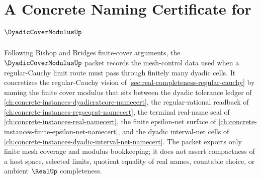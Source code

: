 \chapter{A Concrete Naming Certificate for $\DyadicCoverModulusUp$}
\label{ch:concrete-instances-dyadic-cover-modulus-namecert}

Following Bishop and Bridges finite-cover arguments, the $\DyadicCoverModulusUp$ packet records the mesh-control data used when a regular-Cauchy limit route must pass through finitely many dyadic cells. It concretizes the regular-Cauchy vision of \autoref{sec:real-completeness-regular-cauchy} by naming the finite cover modulus that sits between the dyadic tolerance ledger of \autoref{ch:concrete-instances-dyadicratcore-namecert}, the regular-rational readback of \autoref{ch:concrete-instances-regseqrat-namecert}, the terminal real-name seal of \autoref{ch:concrete-instances-real-namecert}, the finite epsilon-net surface of \autoref{ch:concrete-instances-finite-epsilon-net-namecert}, and the dyadic interval-net cells of \autoref{ch:concrete-instances-dyadic-interval-net-namecert}. The packet exports only finite mesh coverage and modulus bookkeeping; it does not assert compactness of a host space, selected limits, quotient equality of real names, countable choice, or ambient $\RealUp$ completeness.

